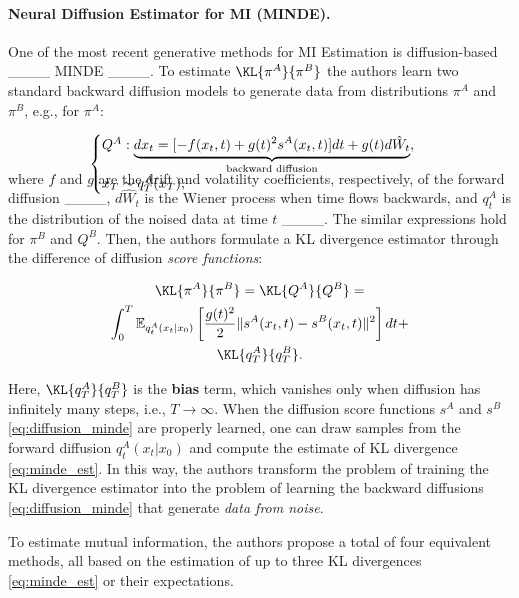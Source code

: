 \vspace{-3mm}
\paragraph{Neural Diffusion Estimator for MI (MINDE).} \label{sec:minde}

One of the most recent generative methods for MI Estimation is diffusion-based ____ MINDE ____. To estimate $\KL{\pi^A}{\pi^B}$ the authors learn two standard backward diffusion models to generate data from distributions $\pi^A$ and $\pi^B$, e.g., for $\pi^A$:


\vspace{-4mm}
\begin{gather}
    \begin{cases}
    Q^A: \underbrace{dx_{t}=[-f(x_t, t) + g(t)^2 s^{A}(x_t, t)]dt + g(t)d\hat{W}_t}_{\text{backward diffusion}}, \\
    x_T \sim q^A_{T}(x_T), \label{eq:diffusion_minde}
    \end{cases}
    \vspace{-10mm}
\end{gather}
\vspace{-4mm}


where $f$ and $g$ are the drift and volatility coefficients, respectively, of the forward diffusion ____, $d\hat{W}_t$ is the Wiener process when time flows backwards, and $q^A_{t}$ is the distribution of the noised data at time $t$ ____. The similar expressions hold for $\pi^B$ and $Q^B$. Then, the authors formulate a KL divergence estimator through the difference of diffusion \textit{score functions}:

\vspace{-5mm}
\begin{gather}
    \KL{\pi^A}{\pi^B}=\KL{Q^A}{Q^B}=
    \nonumber
    \\
    \int_0^T \mathbb{E}_{q^A_t(x_t|x_0)} \left[ 
    \frac{g(t)^2}{2}
    \| s^{A}(x_t, t) - s^{B}(x_t, t) \|^2\right]dt +
    \nonumber
    \\
    \KL{q^A_{T}}{q^B_{T}} \label{eq:minde_est}.
\end{gather}
\vspace{-4mm}

Here, $\KL{q^A_{T}}{q^B_{T}}$ is the \textbf{bias} term, which vanishes only when diffusion has infinitely many steps, i.e., $T \rightarrow \infty$.  When the diffusion score functions $s^A$ and $s^B$ \eqref{eq:diffusion_minde} are properly learned, one can draw samples from the forward diffusion $q^A_t(x_t|x_0)$ and compute the estimate of KL divergence \eqref{eq:minde_est}. In this way, the authors transform the problem of training the KL divergence estimator into the problem of learning the backward diffusions \eqref{eq:diffusion_minde} that generate \textit{data from noise}.

To estimate mutual information, the authors propose a total of four equivalent methods, all based on the estimation of up to three KL divergences \eqref{eq:minde_est} or their expectations.

\vspace{-3mm}